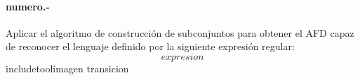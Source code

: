 
\paragraph{{numero}.-}\label{p{numero}}
Aplicar el algoritmo de construcción de subconjuntos para obtener el AFD capaz de reconocer el lenguaje definido por la siguiente expresión regular:
\[
    {expresion}
\]
{includetool}{{imagen}}
{transicion}
